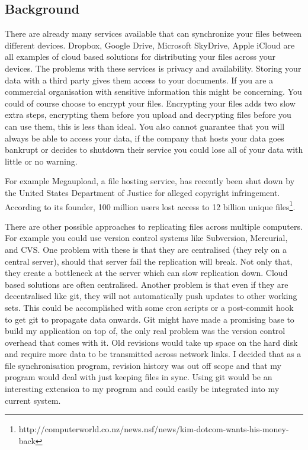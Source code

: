 \documentclass[12pt]{article}
\begin{document}
\subsection{Background}
There are already many services available
that can synchronize your files between different devices. 
Dropbox, Google Drive, Microsoft SkyDrive, Apple iCloud
are all examples of cloud based solutions for distributing
your files across your devices. The problems with these
services is privacy and availability. Storing your data with a
third party gives them access to your documents. If you
are a commercial organisation with sensitive information
this might be concerning. You could
of course choose to encrypt your files. Encrypting your files adds
two slow extra steps, encrypting them before you upload and decrypting
files before you can use them, this is less than ideal. 
You also cannot guarantee
that you will always be able to access your data, if
the company that hosts your data goes bankrupt or
decides to shutdown their service
you could lose all
of your data with little or no warning. 

For example Megaupload, a file hosting service,
has recently been shut down by the United States Department of
Justice for alleged copyright infringement. According to
its founder, 100 million users lost access to 12 billion
unique files\footnote{http://computerworld.co.nz/news.nsf/news/kim-dotcom-wants-his-money-back}.

There are other possible approaches to replicating files
across multiple computers. For example you could use
version control systems like Subversion, Mercurial, and
CVS. One problem with these is that they are
centralised (they rely on a central server), should that
server fail the replication will break. Not only
that, they create a bottleneck at the server which can slow
replication down.
Cloud based solutions are often centralised. 
Another problem is that even if they are decentralised
like git, they will not automatically push updates to other
working sets. This could be accomplished with some
cron scripts or a post-commit hook to get git to
propagate data onwards. Git might have made a promising
base to build my application on top of, the only real
problem was the version control overhead that comes with
it. Old revisions would take up space on the hard disk
and require more data to be transmitted across network links.
I decided that as a file synchronisation program, revision
history was out off scope and that my program would
deal with just keeping files in sync. Using git would be
an interesting extension to my program and could easily
be integrated into my current system.
\end{document}
